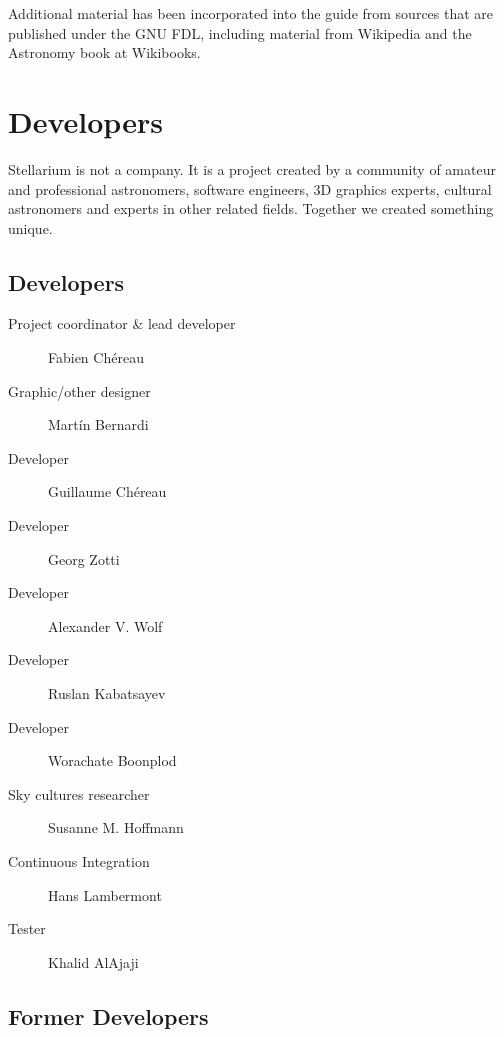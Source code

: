 Additional material has been incorporated into the guide from sources
that are published under the GNU FDL, including material from Wikipedia
and the Astronomy book at Wikibooks.

\section{Developers}
\label{sec:Developers}

Stellarium is not a company. It is a project created by a community of
amateur and professional astronomers, software engineers, 3D graphics
experts, cultural astronomers and experts in other related
fields. Together we created something unique.


\subsection{Developers}
\begin{description}
\item[Project coordinator \& lead developer] Fabien Chéreau
\item[Graphic/other designer] Martín Bernardi
\item[Developer] Guillaume Chéreau
\item[Developer] Georg Zotti
\item[Developer] Alexander V. Wolf
\item[Developer] Ruslan Kabatsayev
\item[Developer] Worachate Boonplod
\item[Sky cultures researcher] Susanne M. Hoffmann
\item[Continuous Integration] Hans Lambermont
\item[Tester] Khalid AlAjaji
\end{description}

\subsection{Former Developers}

